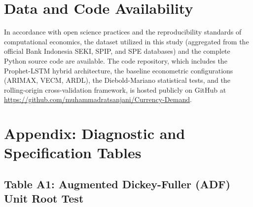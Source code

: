 \documentclass[12pt, letterpaper]{article}
\begin{document}
\section*{Data and Code Availability}
In accordance with open science practices and the reproducibility standards of computational economics, the dataset utilized in this study (aggregated from the official Bank Indonesia SEKI, SPIP, and SPE databases) and the complete Python source code are available. The code repository, which includes the Prophet-LSTM hybrid architecture, the baseline econometric configurations (ARIMAX, VECM, ARDL), the Diebold-Mariano statistical tests, and the rolling-origin cross-validation framework, is hosted publicly on GitHub at \url{https://github.com/muhammadratsanjani/Currency-Demand}.

\appendix
\section*{Appendix: Diagnostic and Specification Tables}

\subsection*{Table A1: Augmented Dickey-Fuller (ADF) Unit Root Test}
\begin{table}[ht]
\centering
{}
\end{table}
\end{document}
